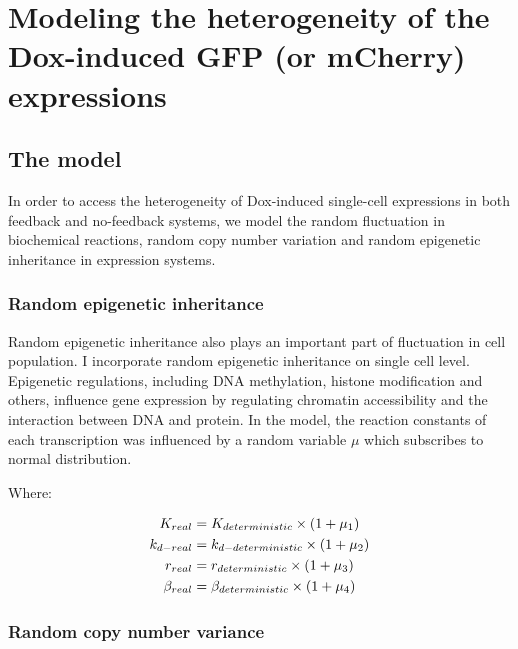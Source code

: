 \chapter{Modeling  the heterogeneity of the Dox-induced GFP (or mCherry) expressions} %

\label{Part3_chapter} %

\section{The model}
In order to access the heterogeneity of Dox-induced single-cell expressions in both feedback and no-feedback systems, we model the random ﬂuctuation in biochemical reactions, random copy number variation and random epigenetic inheritance in expression systems.

\subsection{Random epigenetic inheritance}

Random epigenetic inheritance also plays an important part of ﬂuctuation in cell population. I incorporate random epigenetic inheritance on single cell level. Epigenetic regulations, including DNA methylation, histone modiﬁcation and others, inﬂuence gene expression by regulating chromatin accessibility and the interaction between DNA and protein. In the model, the reaction constants of each transcription was influenced by a random variable $\mu$ which subscribes to normal distribution.

Where:

\begin{equation} 
\begin{aligned} 
\centering
K_{real}   &= K_{deterministic} \times (1+\mu_1) \\
k_{d-real} &= k_{d-deterministic} \times (1+\mu_2) \\
r_{real}   &= r_{deterministic} \times (1+\mu_3) \\
\beta_{real}   &= \beta_{deterministic} \times (1+\mu_4) \\
\end{aligned} 
\end{equation}

\subsection{Random copy number variance}

